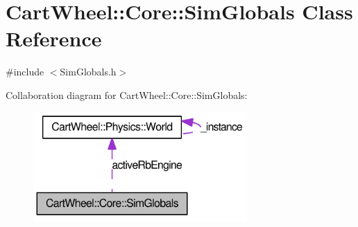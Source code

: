 \hypertarget{classCartWheel_1_1Core_1_1SimGlobals}{
\section{CartWheel::Core::SimGlobals Class Reference}
\label{classCartWheel_1_1Core_1_1SimGlobals}
}


{\ttfamily \#include $<$SimGlobals.h$>$}



Collaboration diagram for CartWheel::Core::SimGlobals:\nopagebreak
\begin{figure}[H]
\begin{center}
\leavevmode
\includegraphics[width=231pt]{classCartWheel_1_1Core_1_1SimGlobals__coll__graph}
\end{center}
\end{figure}
